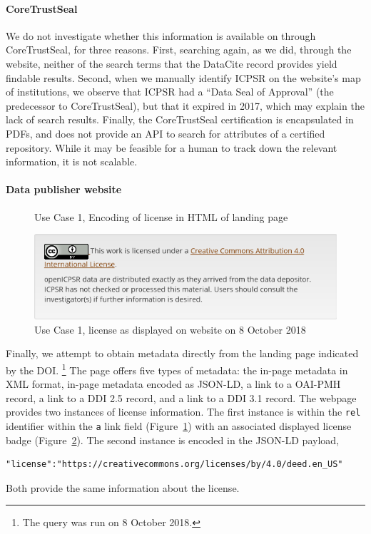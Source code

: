 \paragraph{CoreTrustSeal}
We do not investigate whether this information is available on through CoreTrustSeal, for three reasons. First, searching again, as we did, through the website, neither of the search terms that the DataCite record provides yield findable results. Second, when we manually identify ICPSR on the website's map of institutions, we observe that ICPSR had a ``Data Seal of Approval'' (the predecessor to CoreTrustSeal), but that it expired in 2017, which may explain the lack of search results. Finally, the CoreTrustSeal certification is encapsulated in PDFs, and does not provide an API to search for attributes of a certified repository. While it may be feasible for a human to track down the relevant information, it is not scalable.

\paragraph{Data publisher website}
\newcommand{\icpsrdate}{8 October 2018}
\begin{figure}

    \caption{Use Case 1, Encoding of license in HTML of landing page}
    \label{fig:case1:rela}
\end{figure}
\begin{figure}
    \centering
    \includegraphics[width=0.5\linewidth]{images/openicpsr-license-image.png}
    \caption{Use Case 1, license as displayed on website on \icpsrdate }
    \label{fig:case1:license}
\end{figure}
Finally, we attempt to obtain metadata   directly from the landing page indicated by the \ac{DOI}.%
\footnote{The query was run on \icpsrdate .}
The page offers five types of metadata: the in-page metadata in XML format, in-page metadata encoded as JSON-LD, a link to a OAI-PMH record, a link to a DDI 2.5 record, and a link to a DDI 3.1 record.
The webpage provides two instances of license information. The first instance is within the \texttt{rel} identifier within the \lstinline|a| link field (Figure~\ref{fig:case1:rela}) with an associated displayed  license badge (Figure~\ref{fig:case1:license}).
The second instance is encoded in the JSON-LD payload,
\begin{lstlisting}
"license":"https://creativecommons.org/licenses/by/4.0/deed.en_US"
\end{lstlisting}
Both provide the same information about the license.


